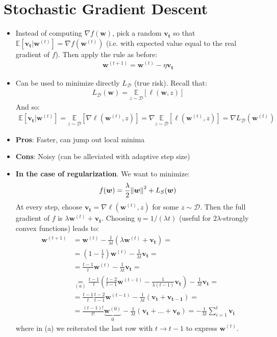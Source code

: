\documentclass[../template.tex]{subfiles}
\begin{document}
\section{Stochastic Gradient Descent}
\begin{itemize}
    \item Instead of computing $\nabla f(\bm{w})$, pick a random $\bm{v_t}$ so that $\mathbb{E}[\bm{v_t} | \bm{w}^{(t)}] = \nabla f(\bm{w}^{(t)})$ (i.e. with expected value equal to the real gradient of $f$). Then apply the rule as before:
    \begin{align*}
        \bm{w}^{(t+1)} = \bm{w}^{(t)} - \eta\bm{v_t} 
    \end{align*}
    \item Can be used to minimize directly $L_{\mathcal{D}}$ (true risk). Recall that:
    \begin{align*}
        L_{\mathcal{D}}(\bm{w}) = \underset{z \sim \mathcal{D}}{\mathbb{E}} [\ell(\bm{w},z)]
    \end{align*}
    And so:
    \begin{align*}
        \mathbb{E}[\bm{v_t}|\bm{w}^{(t)}] = \underset{z \sim \mathcal{D}}{\mathbb{E}} [\nabla \ell(\bm{w}^{(t)}, z)] = \nabla \underset{z \sim \mathcal{D}}{\mathbb{E}} [\ell(\bm{w}^{(t)}, z)] = \nabla L_{\mathcal{D}}(\bm{w}^{(t)})
    \end{align*}
    \item \textbf{Pros}: Faster, can jump out local minima
    \item \textbf{Cons}: Noisy (can be alleviated with adaptive step size) 
    \item \textbf{In the case of regularization}. We want to minimize:
    \begin{align*}
        f(\bm{w}) = \frac{\lambda}{2} \norm{\bm{w}}^2 + L_S(\bm{w})
    \end{align*} 
    At every step, choose $\bm{v_t} = \nabla \ell(\bm{w}^{(t)}, z)$ for some $z \sim \mathcal{D}$. Then the full gradient of $f$ is $\lambda \bm{w}^{(t)} + \bm{v_t}$. Choosing $\eta = 1/(\lambda t)$ (useful for $2\lambda$-strongly convex functions) leads to:
    \begin{align*}
        \bm{w}^{(t+1)} &= \bm{w}^{(t)} - \frac{1}{\lambda t}\left(\lambda \bm{w}^{(t)} + \bm{v_t}\right) =\\
        &= \left(1-\frac{1}{t} \right)\bm{w}^{(t)} - \frac{1}{\lambda t} \bm{v_t}  =\\
        &= \frac{t-1}{t} \bm{w}^{(t)}  - \frac{1}{\lambda t} \bm{v_t}  =\\
        &\underset{(a)}{=}  \frac{t-1}{t} \left(\frac{t-2}{t-1} \bm{w}^{(t-1)} - \frac{1}{\lambda(t-1)}\bm{v_t}  \right) - \frac{1}{\lambda t} \bm{v_t} =\\
        &= \frac{t-1}{t} \frac{t-2}{t-1} \bm{w}^{(t-1)} - \frac{1}{\lambda t} (\bm{v_t} + \bm{v_{t-1}}) =\\
        &= \frac{(t-1)!}{t!} \underbrace{\bm{w}^{(0)}}_{0} - \frac{1}{\lambda t} (\bm{v_t} + \dots + \bm{v_0}) = -\frac{1}{\lambda t} \sum_{i=1}^t \bm{v_i} 
    \end{align*}
    where in (a) we reiterated the last row with $t \to t-1$ to express $\bm{w}^{(t)}$.
\end{itemize}
\end{document}
